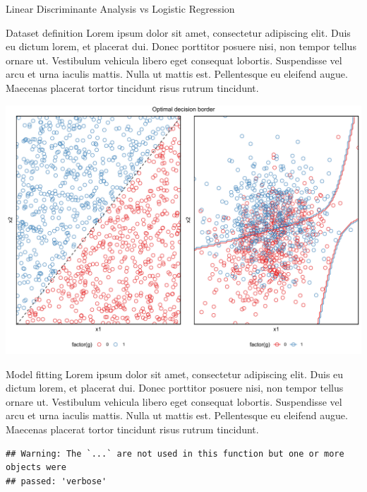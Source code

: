 \documentclass[
  ignorenonframetext,
]{article}
\begin{document}
\begin{frame}[fragile]{Linear Discriminante Analysis vs Logistic Regression}
\protect\hypertarget{linear-discriminante-analysis-vs-logistic-regression}{}
\begin{block}{Dataset definition}
\protect\hypertarget{dataset-definition-2}{}
Lorem ipsum dolor sit amet, consectetur adipiscing elit. Duis eu dictum lorem, et placerat dui. Donec porttitor posuere nisi, non tempor tellus ornare ut. Vestibulum vehicula libero eget consequat lobortis. Suspendisse vel arcu et urna iaculis mattis. Nulla ut mattis est. Pellentesque eu eleifend augue. Maecenas placerat tortor tincidunt risus rutrum tincidunt.

\begin{center}\includegraphics{_main_files/figure-beamer/unnamed-chunk-41-1} \end{center}
\end{block}

\begin{block}{Model fitting}
\protect\hypertarget{model-fitting-2}{}
Lorem ipsum dolor sit amet, consectetur adipiscing elit. Duis eu dictum lorem, et placerat dui. Donec porttitor posuere nisi, non tempor tellus ornare ut. Vestibulum vehicula libero eget consequat lobortis. Suspendisse vel arcu et urna iaculis mattis. Nulla ut mattis est. Pellentesque eu eleifend augue. Maecenas placerat tortor tincidunt risus rutrum tincidunt.

\begin{verbatim}
## Warning: The `...` are not used in this function but one or more objects were
## passed: 'verbose'
\end{verbatim}


\end{block}
\end{frame}
\end{document}
